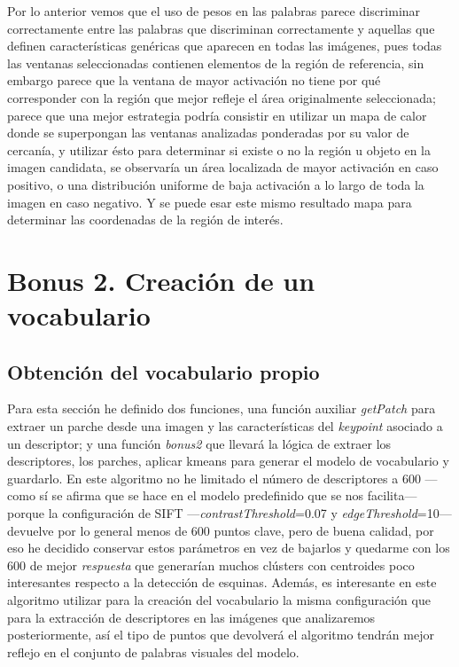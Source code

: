 \documentclass{article}
\begin{document}
Por lo anterior vemos que el uso de pesos en las palabras parece discriminar correctamente entre las palabras que discriminan correctamente y aquellas que definen características genéricas que aparecen en todas las imágenes, pues todas las ventanas seleccionadas contienen elementos de la región de referencia, sin embargo parece que la ventana de mayor activación no tiene por qué corresponder con la región que mejor refleje el área originalmente seleccionada; parece que una mejor estrategia podría consistir en utilizar un mapa de calor donde se superpongan las ventanas analizadas ponderadas por su valor de cercanía, y utilizar ésto para determinar si existe o no la región u objeto en la imagen candidata, se observaría un área localizada de mayor activación en caso positivo, o una distribución uniforme de baja activación a lo largo de toda la imagen en caso negativo. Y se puede esar este mismo resultado mapa para determinar las coordenadas de la región de interés.

\section{Bonus 2. Creación de un vocabulario}

\subsection{Obtención del vocabulario propio}

Para esta sección he definido dos funciones, una función auxiliar \textit{getPatch} para extraer un parche desde una imagen y las características del \textit{keypoint} asociado a un descriptor; y una función \textit{bonus2} que llevará la lógica de extraer los descriptores, los parches, aplicar kmeans para generar el modelo de vocabulario y guardarlo. En este algoritmo no he limitado el número de descriptores a 600 ---como sí se afirma que se hace en el modelo predefinido que se nos facilita--- porque la configuración de SIFT ---\textit{contrastThreshold}=0.07 y \textit{edgeThreshold}=10--- devuelve por lo general menos de 600 puntos clave, pero de buena calidad, por eso he decidido conservar estos parámetros en vez de bajarlos y quedarme con los 600 de mejor \textit{respuesta} que generarían muchos clústers con centroides poco interesantes respecto a la detección de esquinas. Además, es interesante en este algoritmo utilizar para la creación del vocabulario la misma configuración que para la extracción de descriptores en las imágenes que analizaremos posteriormente, así el tipo de puntos que devolverá el algoritmo tendrán mejor reflejo en el conjunto de palabras visuales del modelo.
\end{document}
